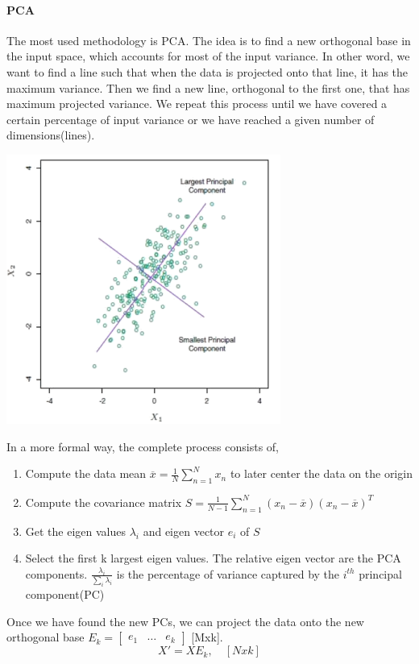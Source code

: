 \documentclass[../main.tex]{subfiles}
\begin{document}
\paragraph{PCA} The most used methodology is PCA. The idea is to find a new orthogonal base in the input space, which accounts for most of the input variance. In other word, we want to find a line such that when the data is projected onto that line, it has the maximum variance. Then we find a new line, orthogonal to the first one, that has maximum projected variance. We repeat this process until we have covered a certain percentage of input variance or we have reached a given number of dimensions(lines).
\begin{center}
    \includegraphics[width=90mm]{images/PCA.png} \\
\end{center}
In a more formal way, the complete process consists of,
\begin{enumerate}
    \item Compute the data mean $\overline{x} = \frac{1}{N} \sum_{n=1}^N x_n$ to later center the data on the origin
    \item Compute the covariance matrix $S = \frac{1}{N-1} \sum_{n=1}^N (x_n-\overline{x})(x_n-\overline{x})^T$
    \item Get the eigen values $\lambda_i$ and eigen vector $e_i$ of $S$
    \item Select the first k largest eigen values. The relative eigen vector are the PCA components. $\frac{\lambda_i}{\sum_i \lambda_i}$ is the percentage of variance captured by the $i^{th}$ principal component(PC)
\end{enumerate}
Once we have found the new PCs, we can project the data onto the new orthogonal base $E_k = \begin{bmatrix} e_1 & \dots & e_k \end{bmatrix}$ [Mxk].
\begin{equation}
    X'=XE_k, \quad [Nxk]
\end{equation}
\end{document}
